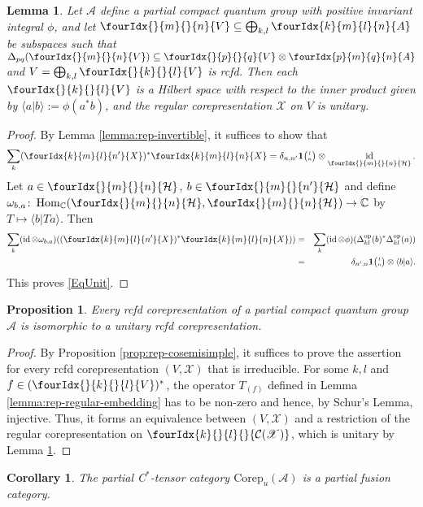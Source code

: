 \documentclass[10pt]{article}
\DeclareMathOperator{\id}{id}
\DeclareMathOperator{\Hom}{Hom}
\DeclareMathOperator{\op}{\mathrm{op}}
\newcommand{\dual}[1]{#1^{*}}
\newcommand{\Corep}{\mathrm{Corep}}
\newcommand{\C}{\mathbb{C}}
\newcommand{\Hsp}{\mathcal{H}}
\newcommand{\Grt}[3]{#1{\tiny {\begin{pmatrix} #2\\#3\end{pmatrix}}}}
\newcommand{\UnitC}[2]{\Grt{\mathbf{1}}{#1}{#2}}
\newcommand{\Gr}[5]{\fourIdx{#2}{#4}{#3}{#5}{#1}}%
\newcommand{\Gru}[3]{\Gr{#1}{}{}{#2}{#3}}
\newcommand{\Grd}[3]{\Gr{#1}{#2}{#3}{}{}}
\newtheorem{Lem}[Theorem]{Lemma}
\newtheorem{Prop}[Theorem]{Proposition}
\newtheorem{Cor}[Theorem]{Corollary}
\theoremstyle{definition}
\numberwithin{equation}{section}
\begin{document}
\begin{Lem} \label{lemma:rep-regular-unitary}
  Let $\mathscr{A}$ define a partial compact quantum group with
positive invariant  integral $\phi$, and let $\Gru{V}{m}{n} \subseteq
\bigoplus_{k,l} \Gr{A}{k}{l}{m}{n}$ be subspaces such that
$\Delta_{pq}(\Gru{V}{m}{n}) \subseteq \Gru{V}{p}{q} \otimes
    \Gr{A}{p}{q}{m}{n}$ and $V=\bigoplus_{k,l} \Gru{V}{k}{l}$ is rcfd. Then each $\Gru{V}{k}{l}$ is a Hilbert space with
    respect to the inner product given by $\langle
    a|b\rangle:=\phi(a^{*}b)$, and the regular corepresentation
    $\mathscr{X}$ on $V$ is unitary.
\end{Lem}
\begin{proof} 
By Lemma \ref{lemma:rep-invertible},  it suffices to show that
  \begin{equation}\label{EqUnit} \sum_{k}
    (\Gr{X}{k}{l}{m}{n'})^* \Gr{X}{k}{l}{m}{n} =
    \delta_{n,n'}\UnitC{l}{n}\otimes
    \id_{\Gru{\Hsp}{m}{n}}.
  \end{equation} 
Let  $a\in \Gru{\Hsp}{m}{n}$, $b\in \Gru{\Hsp}{m}{n'}$ and define $\omega_{b,a} \colon
\Hom_{\C}(\Gru{\Hsp}{m}{n},\Gru{\Hsp}{m}{n}) \to \C$ by $T
\mapsto \langle b|Ta\rangle$. Then
\begin{eqnarray*}
\sum_{k }(\id \otimes \omega_{b,a})
((\Gr{X}{k}{l}{m}{n'})^* \Gr{X}{k}{l}{m}{n}))  &=& \sum_k
(\id\otimes \phi)(\Delta_{kl}^{\op}(b)^*\Delta_{kl}^{\op}(a)) \\&=&
  \delta_{n',n} \UnitC{l}{n} \otimes \langle b|a\rangle.
\end{eqnarray*} 
This proves \eqref{EqUnit}.
\end{proof} 

\begin{Prop} \label{prop:rep-unitarisable} Every  rcfd
  corepresentation of a partial compact quantum group $\mathscr{A}$ is
  isomorphic to a unitary rcfd corepresentation.
\end{Prop}
\begin{proof}
  By Proposition \ref{prop:rep-cosemisimple}, it suffices to prove the
  assertion for every rcfd corepresentation $(V,\mathscr{X})$ that is
  irreducible.  For some $k,l$ and $f \in
  \dual{(\Gru{V}{k}{l})}$, the operator $T_{(f)}$ defined in
  Lemma \ref{lemma:rep-regular-embedding} has to be non-zero and
  hence, by Schur's Lemma, injective. Thus, it forms an equivalence
  between $(V,\mathscr{X})$ and a restriction of the regular
  corepresentation on $\Grd{\mathcal{C}(\mathscr{X})}{k}{l}$, which is
  unitary by Lemma \ref{lemma:rep-regular-unitary}.
\end{proof}
\begin{Cor} The partial C$^*$-tensor category $\Corep_u(\mathscr{A})$ is a partial fusion category.
\end{Cor}
\end{document}
